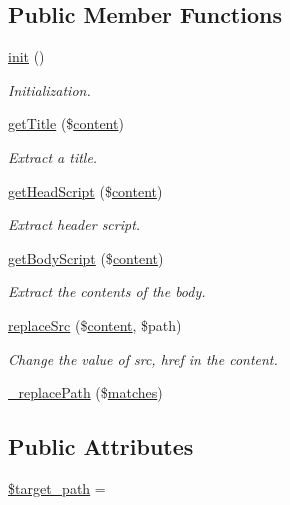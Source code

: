 \subsection*{Public Member Functions}
\begin{DoxyCompactItemize}
\item 
\hyperlink{classpageController_ace5123ac45ab7dc1c9c39f3e1901e0a0}{init} ()
\begin{DoxyCompactList}\small\item\em Initialization. \end{DoxyCompactList}\item 
\hyperlink{classpageController_ab5c9e55fad71e3a0c961b3d84d660f3c}{get\+Title} (\$\hyperlink{classcontent}{content})
\begin{DoxyCompactList}\small\item\em Extract a title. \end{DoxyCompactList}\item 
\hyperlink{classpageController_a7fc1046874a92835813b27613857890c}{get\+Head\+Script} (\$\hyperlink{classcontent}{content})
\begin{DoxyCompactList}\small\item\em Extract header script. \end{DoxyCompactList}\item 
\hyperlink{classpageController_a8c5c1bd477ffc4beda5af3b6d3cee63f}{get\+Body\+Script} (\$\hyperlink{classcontent}{content})
\begin{DoxyCompactList}\small\item\em Extract the contents of the body. \end{DoxyCompactList}\item 
\hyperlink{classpageController_a9e6b4820d017d82f1f81598254da4092}{replace\+Src} (\$\hyperlink{classcontent}{content}, \$path)
\begin{DoxyCompactList}\small\item\em Change the value of src, href in the content. \end{DoxyCompactList}\item 
\hyperlink{classpageController_abd8a05c83337866bd8e06057c0e6dc4f}{\+\_\+replace\+Path} (\$\hyperlink{jquery_8mobile_8customized_8min_8js_a0dd9fb10d0da7ad1a1c71aad2c6388f7}{matches})
\end{DoxyCompactItemize}
\subsection*{Public Attributes}
\begin{DoxyCompactItemize}
\item 
\hyperlink{classpageController_aad7c7b9ade651130997578967a69a48c}{\$target\+\_\+path} = \textquotesingle{}\textquotesingle{}
\end{DoxyCompactItemize}


